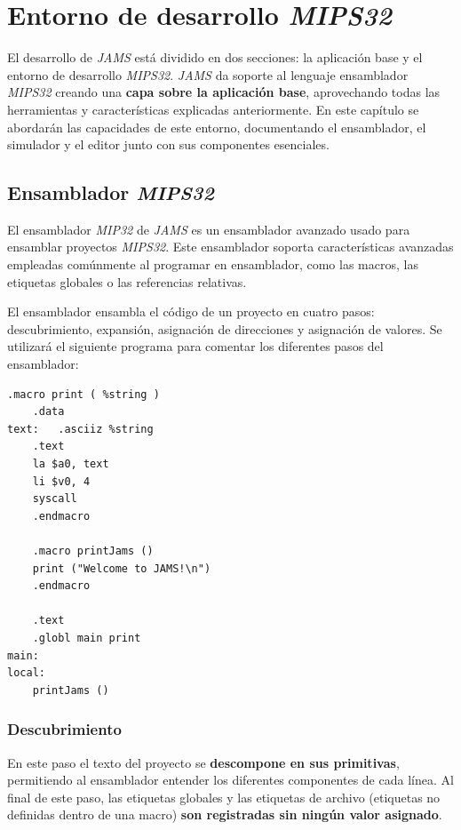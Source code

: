 \chapter{Entorno de desarrollo \textit{MIPS32}}\label{ch:entorno-de-desarrollo-mips32}

El desarrollo de \textit{JAMS} está dividido en dos secciones:
la aplicación base y el entorno de desarrollo \textit{MIPS32}.
\textit{JAMS} da soporte al lenguaje ensamblador \textit{MIPS32}
creando una \textbf{capa sobre la aplicación base},
aprovechando todas las herramientas y características explicadas anteriormente.
En este capítulo se abordarán las capacidades de este entorno,
documentando el ensamblador, el simulador y el editor junto
con sus componentes esenciales.


\section{Ensamblador \textit{MIPS32}}\label{sec:ensamblador-mips32}

El ensamblador \textit{MIP32} de \textit{JAMS} es un ensamblador avanzado
usado para ensamblar proyectos \textit{MIPS32}.
Este ensamblador soporta características avanzadas empleadas
comúnmente al programar en ensamblador, como las macros,
las etiquetas globales o las referencias relativas.

\noindent El ensamblador ensambla el código de un proyecto en cuatro pasos:
descubrimiento, expansión, asignación de direcciones y asignación de valores.
Se utilizará el siguiente programa para comentar los
diferentes pasos del ensamblador:

\begin{lstlisting}[frame=single,label={lst:example.asm}]
    .macro print ( %string )
    .data
text:   .asciiz %string
    .text
    la $a0, text
    li $v0, 4
    syscall
    .endmacro

    .macro printJams ()
    print ("Welcome to JAMS!\n")
    .endmacro

    .text
    .globl main print
main:
local:
    printJams ()
\end{lstlisting}

\subsection{Descubrimiento}\label{subsec:descubrimiento}

En este paso el texto del proyecto se \textbf{descompone en sus primitivas},
permitiendo al ensamblador entender los diferentes componentes de cada línea.
Al final de este paso, las etiquetas globales y las etiquetas de archivo
(etiquetas no definidas dentro de una macro) \textbf{son registradas sin
ningún valor asignado}.

